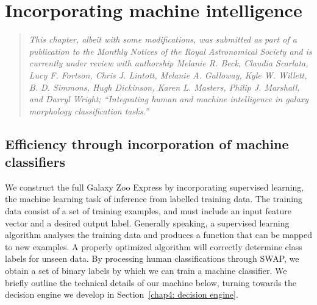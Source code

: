 
\chapter{Incorporating machine intelligence}
\label{chap4}

\begin{quote}
\emph{This chapter, albeit with some modifications, was submitted as part of a publication to the Monthly Notices of the Royal Astronomical Society and is currently under review with authorship Melanie R. Beck, Claudia Scarlata, Lucy F. Fortson, Chris J. Lintott, Melanie A. Galloway, Kyle W. Willett, B. D. Simmons, Hugh Dickinson, Karen L. Masters, Philip J. Marshall, and Darryl Wright; ``Integrating human and machine intelligence in galaxy morphology classification tasks.''}\\
\end{quote}

\section{Efficiency through incorporation of machine classifiers} \label{chap4: machine}

We construct the full Galaxy Zoo Express by incorporating supervised 
learning, the machine learning task of inference from labelled training data. 
The training data consist of a set of training examples, and must include
an input feature vector and a desired output label.  Generally speaking,
a supervised learning algorithm analyses the training data and produces a 
function that can be mapped to new examples. A properly optimized algorithm will 
correctly determine class labels for unseen data. By processing human classifications through SWAP, we obtain a set of binary labels by which we can train a machine classifier. We briefly outline the technical details of our machine below,  turning towards the decision engine we develop in Section~\ref{chap4: decision engine}. 



